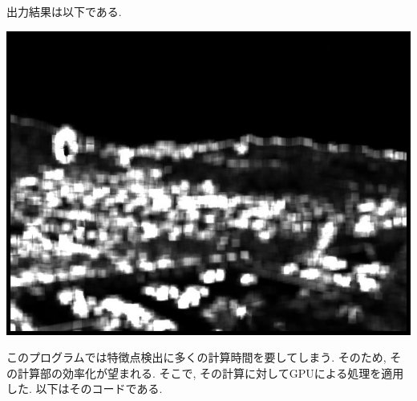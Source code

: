 \documentclass[a4j]{jarticle}
\begin{document}
出力結果は以下である.\\
\begin{center}
\includegraphics[bb=0 0 768 576,scale=.35]{out.jpg}
\end{center}
このプログラムでは特徴点検出に多くの計算時間を要してしまう. 
そのため, その計算部の効率化が望まれる. 
そこで, その計算に対してGPUによる処理を適用した. 
以下はそのコードである. 
\end{document}
